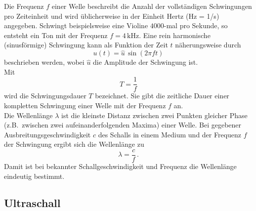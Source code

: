\documentclass[
	german,%
	accentcolor=3d,%
	type=intern, %
	marginpar=false,%
]{tudapub}
\begin{document}
      Die Frequenz \(f\) einer Welle beschreibt die Anzahl der vollständigen Schwingungen pro Zeiteinheit und wird üblicherweise in der Einheit Hertz (Hz = 1/s) angegeben. Schwingt beispielsweise eine Violine \(4000\)-mal pro Sekunde, so entsteht ein Ton mit der Frequenz \(f = 4\,\mathrm{kHz}\). Eine rein harmonische (sinusförmige) Schwingung kann als Funktion der Zeit \(t\) näherungsweise durch
      \[
         u(t) = \hat{u}\,\sin(2\pi f t)
      \]
      beschrieben werden, wobei \(\hat{u}\) die Amplitude der Schwingung ist.
      \\
      Mit
      \begin{equation}
         T = \frac{1}{f}
         \label{eq:periode}
      \end{equation}
      wird die Schwingungsdauer \(T\) bezeichnet. Sie gibt die zeitliche Dauer einer kompletten Schwingung einer Welle mit der Frequenz \(f\) an.
      \\
      Die Wellenlänge \(\lambda\) ist die kleinste Distanz zwischen zwei Punkten gleicher Phase 
      (z.B.\ zwischen zwei aufeinanderfolgenden Maxima) einer Welle. Bei gegebener Ausbreitungsgeschwindigkeit \(c\) des Schalls in einem Medium und der Frequenz \(f\) der Schwingung ergibt sich die Wellenlänge zu
      \begin{equation}
         \lambda = \frac{c}{f} \, .
         \label{eq:wellenlaenge}
      \end{equation}
      Damit ist bei bekannter Schallgeschwindigkeit und Frequenz die Wellenlänge eindeutig bestimmt.


   \subsection{Ultraschall}\label{sec:ultraschall}
\end{document}
